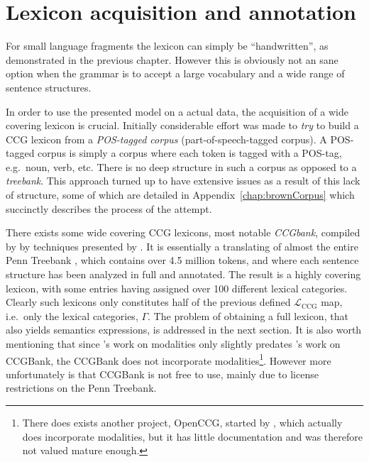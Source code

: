 
\chapter{Lexicon acquisition and annotation}
\label{chap:lexiconAcquisition}

For small language fragments the lexicon can simply be ``handwritten'', as demonstrated in the previous chapter.  However this is obviously not an sane option when the grammar is to accept a large vocabulary and a wide range of sentence structures.

In order to use the presented model on a actual data, the acquisition of a wide covering lexicon is crucial. Initially considerable effort was made to \emph{try} to build a CCG lexicon from a \emph{POS-tagged corpus} (part-of-speech-tagged corpus). A POS-tagged corpus is simply a corpus where each token is tagged with a POS-tag, e.g.\ noun, verb, etc. There is no deep structure in such a corpus as opposed to a \emph{treebank}. This approach turned up to have extensive issues as a result of this lack of structure, some of which are detailed in Appendix~\ref{chap:brownCorpus} which succinctly describes the process of the attempt.

There exists some wide covering CCG lexicons, most notable \emph{CCGbank}, compiled by \citeauthor{ccgBank}  by techniques presented by \cite{juliaThesis}. It is essentially a translating of almost the entire Penn Treebank \cite{pennTreebank}, which contains over 4.5 million tokens, and where each sentence structure has been analyzed in full and annotated. The result is a highly covering lexicon, with some entries having assigned over 100 different lexical categories. Clearly such lexicons only constitutes half of the previous defined $\mathcal{L}_\mathrm{CCG}$ map, i.e.\ only the lexical categories, $\Gamma$. The problem of obtaining a full lexicon, that also yields semantics expressions, is addressed in the next section. It is also worth mentioning that since \citeauthor{baldridgeThesis}'s  work on modalities only slightly predates \citeauthor{juliaThesis}'s  work on CCGBank, the CCGBank does not incorporate modalities\footnote{There does exists another project, OpenCCG, started by \citeauthor{baldridgeThesis}, which actually does incorporate modalities, but it has little documentation and was therefore not valued mature enough.}. However more unfortunately is that CCGBank is not free to use, mainly due to license restrictions on the Penn Treebank.%

